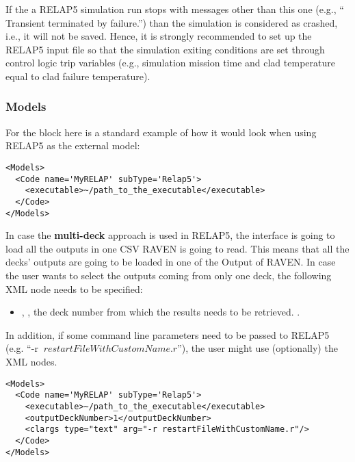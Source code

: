 If the a RELAP5 simulation run stops with messages other than this one (e.g., `` Transient terminated by failure.'') than the simulation is considered as
crashed, i.e., it will not be saved.
Hence, it is strongly recommended to set up the RELAP5 input file so that the simulation exiting conditions are set through control logic trip variables
(e.g., simulation mission time and clad temperature equal to clad failure temperature).

\subsubsection{Models}
For the  block here is a standard example of how it would look
when using RELAP5 as the external model:
\begin{lstlisting}[style=XML]
<Models>
  <Code name='MyRELAP' subType='Relap5'>
    <executable>~/path_to_the_executable</executable>
  </Code>
</Models>
\end{lstlisting}
In case the \textbf{multi-deck} approach is used in RELAP5, the interface is going to load all the outputs in one CSV RAVEN is
going to read. This means that all the decks' outputs are going to be loaded in one of the Output of RAVEN. In case the user
wants to select the outputs coming from only one deck, the following XML node needs to be specified:
\begin{itemize}
   \item {}, , the deck number from
   which the results needs to be retrieved. .
\end{itemize}
In addition, if some command line parameters need to be passed to RELAP5 \\(e.g. ``-r
$\: restartFileWithCustomName.r$''), the user might use (optionally) the  XML nodes.
\begin{lstlisting}[style=XML]
<Models>
  <Code name='MyRELAP' subType='Relap5'>
    <executable>~/path_to_the_executable</executable>
    <outputDeckNumber>1</outputDeckNumber>
    <clargs type="text" arg="-r restartFileWithCustomName.r"/>
  </Code>
</Models>
\end{lstlisting}

